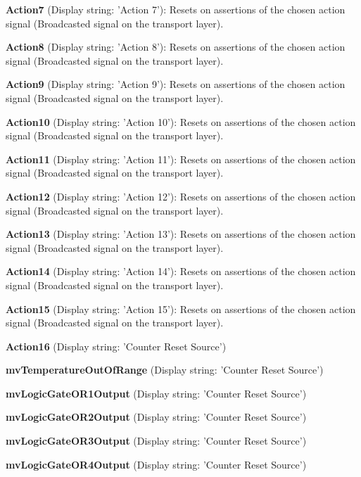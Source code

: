 \begin{DoxyItemize}
\item {\bfseries Action7} (Display string\+: 'Action 7')\+: Resets on assertions of the chosen action signal (Broadcasted signal on the transport layer).
\item {\bfseries Action8} (Display string\+: 'Action 8')\+: Resets on assertions of the chosen action signal (Broadcasted signal on the transport layer).
\item {\bfseries Action9} (Display string\+: 'Action 9')\+: Resets on assertions of the chosen action signal (Broadcasted signal on the transport layer).
\item {\bfseries Action10} (Display string\+: 'Action 10')\+: Resets on assertions of the chosen action signal (Broadcasted signal on the transport layer).
\item {\bfseries Action11} (Display string\+: 'Action 11')\+: Resets on assertions of the chosen action signal (Broadcasted signal on the transport layer).
\item {\bfseries Action12} (Display string\+: 'Action 12')\+: Resets on assertions of the chosen action signal (Broadcasted signal on the transport layer).
\item {\bfseries Action13} (Display string\+: 'Action 13')\+: Resets on assertions of the chosen action signal (Broadcasted signal on the transport layer).
\item {\bfseries Action14} (Display string\+: 'Action 14')\+: Resets on assertions of the chosen action signal (Broadcasted signal on the transport layer).
\item {\bfseries Action15} (Display string\+: 'Action 15')\+: Resets on assertions of the chosen action signal (Broadcasted signal on the transport layer).
\item {\bfseries Action16} (Display string\+: 'Counter Reset Source')
\item {\bfseries mv\+Temperature\+Out\+Of\+Range} (Display string\+: 'Counter Reset Source')
\item {\bfseries mv\+Logic\+Gate\+O\+R1\+Output} (Display string\+: 'Counter Reset Source')
\item {\bfseries mv\+Logic\+Gate\+O\+R2\+Output} (Display string\+: 'Counter Reset Source')
\item {\bfseries mv\+Logic\+Gate\+O\+R3\+Output} (Display string\+: 'Counter Reset Source')
\item {\bfseries mv\+Logic\+Gate\+O\+R4\+Output} (Display string\+: 'Counter Reset Source')
\end{DoxyItemize}

